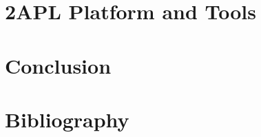 \documentclass[a4paper]{article}
\begin{document}
\section{2APL Platform and Tools} %

\section{Conclusion} %


\section{Bibliography}
\nocite{*}


\end{document}
